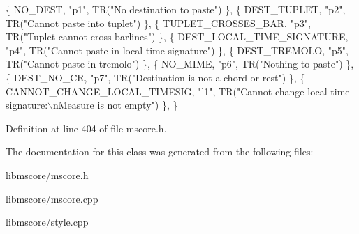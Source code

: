 \begin{DoxyCode}
      \{ NO\_DEST,                         \textcolor{stringliteral}{"p1"}, TR(\textcolor{stringliteral}{"No destination to paste"})                               
                      \},
      \{ DEST\_TUPLET,                     \textcolor{stringliteral}{"p2"}, TR(\textcolor{stringliteral}{"Cannot paste into tuplet"})                              
                      \},
      \{ TUPLET\_CROSSES\_BAR,              \textcolor{stringliteral}{"p3"}, TR(\textcolor{stringliteral}{"Tuplet cannot cross barlines"})                          
                      \},
      \{ DEST\_LOCAL\_TIME\_SIGNATURE,       \textcolor{stringliteral}{"p4"}, TR(\textcolor{stringliteral}{"Cannot paste in local time signature"})                  
                      \},
      \{ DEST\_TREMOLO,                    \textcolor{stringliteral}{"p5"}, TR(\textcolor{stringliteral}{"Cannot paste in tremolo"})                               
                      \},
      \{ NO\_MIME,                         \textcolor{stringliteral}{"p6"}, TR(\textcolor{stringliteral}{"Nothing to paste"})                                      
                      \},
      \{ DEST\_NO\_CR,                      \textcolor{stringliteral}{"p7"}, TR(\textcolor{stringliteral}{"Destination is not a chord or rest"})                    
                      \},
      \{ CANNOT\_CHANGE\_LOCAL\_TIMESIG,     \textcolor{stringliteral}{"l1"}, TR(\textcolor{stringliteral}{"Cannot change local time signature:\(\backslash\)nMeasure is not
       empty"})             \},
      \}
\end{DoxyCode}


Definition at line 404 of file mscore.\+h.



The documentation for this class was generated from the following files\+:\begin{DoxyCompactItemize}
\item 
libmscore/mscore.\+h\item 
libmscore/mscore.\+cpp\item 
libmscore/style.\+cpp\end{DoxyCompactItemize}
